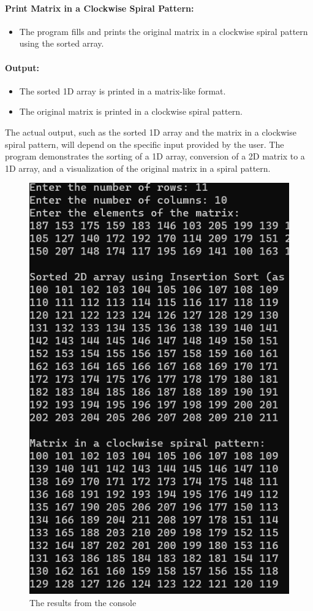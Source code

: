 \documentclass[12pt]{article}
\begin{document}
\paragraph{Print Matrix in a Clockwise Spiral Pattern:}
\begin{itemize}
    \item The program fills and prints the original matrix in a clockwise spiral pattern using the sorted array.
\end{itemize}

\paragraph{Output:}
\begin{itemize}
    \item The sorted 1D array is printed in a matrix-like format.
    \item The original matrix is printed in a clockwise spiral pattern.
\end{itemize}

The actual output, such as the sorted 1D array and the matrix in a clockwise spiral pattern, will depend on the specific input provided by the user. The program demonstrates the sorting of a 1D array, conversion of a 2D matrix to a 1D array, and a visualization of the original matrix in a spiral pattern.


\begin{figure}
    \centering
    \includegraphics[width=0.75\linewidth]{Screenshot 2023-10-06 212655.png}
    \caption{The results from the console}
    \label{fig:enter-label}
\end{figure}
           
\end{document}
